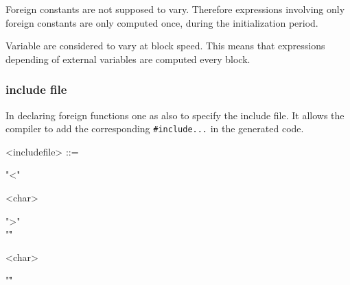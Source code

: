 \documentclass[a4paper,10pt]{book}
\begin{document}
Foreign constants are not supposed to vary. Therefore expressions involving only foreign constants are only computed once, during the initialization period. 

Variable are considered to vary at block speed. This means that expressions depending of external variables are computed every block.


\subsubsection{include file}
In declaring foreign functions one as also to specify the include file. It allows the \faust compiler to add the corresponding \lstinline'#include...' in the generated code.

\begin{grammar}
  <includefile> ::= 
  \begin{syntdiag}
    \begin{stack}
      "<"
      \begin{rep}
        <char>
      \end{rep}
      ">" \\ 
      "\""
      \begin{rep}
        <char>
      \end{rep}
      "\""
    \end{stack}
  \end{syntdiag}
\end{grammar}


%  






\end{document}
